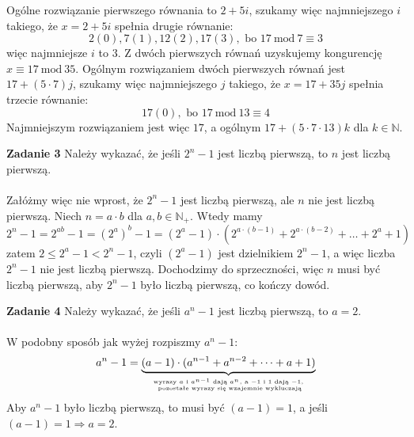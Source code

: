 \documentclass[a4paper,12pt]{article}
\newcommand{\Mod}[1]{\ \mathrm{mod\ #1}}
\begin{document}
\noindent Ogólne rozwiązanie pierwszego równania to $2 + 5i$, szukamy więc najmniejszego $i$ takiego, że $x = 2 + 5i$ spełnia drugie równanie: 
$$2(0), 7(1), 12(2), 17(3), \text{ bo } 17 \Mod 7 \equiv 3$$
więc najmniejsze $i$ to $3$. Z dwóch pierwszych równań uzyskujemy kongurencję $x \equiv 17 \Mod 35$. Ogólnym rozwiązaniem dwóch pierwszych równań jest $17 + (5\cdot 7)j$, szukamy więc najmniejszego $j$ takiego, że $x = 17 + 35j$ spełnia trzecie równanie:
$$17(0), \text{ bo } 17 \Mod 13 \equiv 4$$
Najmniejszym rozwiązaniem jest więc $17$, a ogólnym $17 + (5 \cdot 7 \cdot 13)k$ dla $k \in \mathbb{N}$.

\newpage
\noindent \textbf{Zadanie 3} \newline
Należy wykazać, że jeśli $2^n - 1$ jest liczbą pierwszą, to $n$ jest liczbą pierwszą. \\ \\
Załóżmy więc nie wprost, że $2^n - 1$ jest liczbą pierwszą, ale $n$ nie jest liczbą pierwszą. Niech $n = a\cdot b$ dla $a, b \in \mathbb{N}_+$. Wtedy mamy
$$ 2^n - 1 = 2^{ab} - 1 = (2^a)^b - 1 = (2^a - 1)\cdot \left( 2^{a\cdot(b-1)} + 2^{a\cdot(b-2)} + \dots + 2^a + 1 \right) $$
zatem $2 \leq 2^a - 1 < 2^n - 1$, czyli $(2^a - 1)$ jest dzielnikiem $2^n - 1$, a więc liczba $2^n - 1$ nie jest liczbą pierwszą. Dochodzimy do sprzeczności, więc $n$ musi być liczbą pierwszą, aby $2^n - 1$ było liczbą pierwszą, co kończy dowód.

\noindent \newline \textbf{Zadanie 4} \newline
Należy wykazać, że jeśli $a^n - 1$ jest liczbą pierwszą, to $a = 2$. \\ \\
W podobny sposób jak wyżej rozpiszmy $a^n - 1$:
$$a^n - 1 = \underbrace{(a - 1) \cdot (a^{n-1} + a^{n-2} + \dots + a + 1)}_{\text{wyrazy } a \text{ i } a^{n-1} \text{ dają } a^n, \text{ a } -1 \text{ i } 1 \text{ dają } -1, \atop \text{ pozostałe wyrazy się wzajemnie wykluczają}}$$
Aby $a^n - 1$ było liczbą pierwszą, to musi być $(a - 1) = 1$, a jeśli $(a - 1) = 1 \Rightarrow a = 2$.
\end{document}
